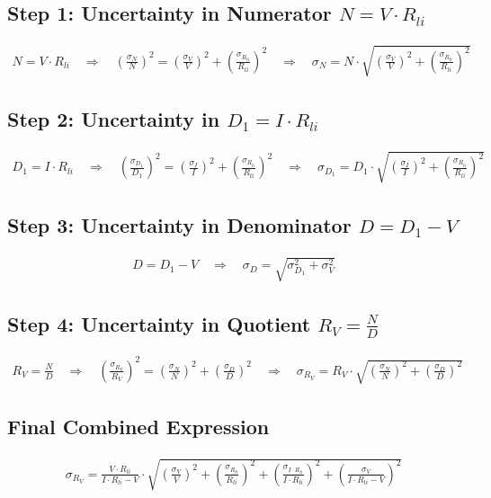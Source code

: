 \documentclass{article} %
\begin{document}
\subsection*{Step 1: Uncertainty in Numerator $N = V \cdot R_{li}$}
\begin{align*}
N = V \cdot R_{li} \quad \Rightarrow \quad \left(\frac{\sigma_N}{N}\right)^2 = \left(\frac{\sigma_V}{V}\right)^2 + \left(\frac{\sigma_{R_{li}}}{R_{li}}\right)^2 \quad \Rightarrow \quad \sigma_N = N \cdot \sqrt{\left(\frac{\sigma_V}{V}\right)^2 + \left(\frac{\sigma_{R_{li}}}{R_{li}}\right)^2}
\end{align*}

\subsection*{Step 2: Uncertainty in $D_1 = I \cdot R_{li}$}
\begin{align*}
D_1 = I \cdot R_{li} \quad \Rightarrow \quad \left(\frac{\sigma_{D_1}}{D_1}\right)^2 = \left(\frac{\sigma_I}{I}\right)^2 + \left(\frac{\sigma_{R_{li}}}{R_{li}}\right)^2 \quad \Rightarrow \quad \sigma_{D_1} = D_1 \cdot \sqrt{\left(\frac{\sigma_I}{I}\right)^2 + \left(\frac{\sigma_{R_{li}}}{R_{li}}\right)^2}
\end{align*}

\subsection*{Step 3: Uncertainty in Denominator $D = D_1 - V$}
\begin{align*}
D = D_1 - V \quad \Rightarrow \quad \sigma_D = \sqrt{\sigma_{D_1}^2 + \sigma_V^2}
\end{align*}

\subsection*{Step 4: Uncertainty in Quotient $R_V = \frac{N}{D}$}
\begin{align*}
R_V = \frac{N}{D} \quad \Rightarrow \quad \left(\frac{\sigma_{R_V}}{R_V}\right)^2 = \left(\frac{\sigma_N}{N}\right)^2 + \left(\frac{\sigma_D}{D}\right)^2 \quad \Rightarrow \quad \sigma_{R_V} = R_V \cdot \sqrt{\left(\frac{\sigma_N}{N}\right)^2 + \left(\frac{\sigma_D}{D}\right)^2}
\end{align*}

\subsection*{Final Combined Expression}
\begin{align*}
\sigma_{R_V} = \frac{V \cdot R_{li}}{I \cdot R_{li} - V} \cdot \sqrt{\left(\frac{\sigma_V}{V}\right)^2 + \left(\frac{\sigma_{R_{li}}}{R_{li}}\right)^2 + \left(\frac{\sigma_{I \cdot R_{li}}}{I \cdot R_{li}}\right)^2 + \left(\frac{\sigma_V}{I \cdot R_{li} - V}\right)^2}
\end{align*}
\end{document}
